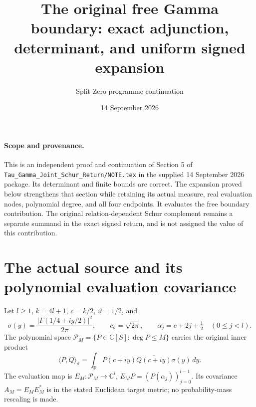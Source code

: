 \documentclass[11pt,a4paper]{article}
\title{The original free Gamma boundary: exact adjunction, determinant, and uniform signed expansion}
\author{Split-Zero programme continuation}
\date{14 September 2026}
\newcommand{\C}{\mathbb C}
\newcommand{\R}{\mathbb R}
\begin{document}
\maketitle
\paragraph{Scope and provenance.}
This is an independent proof and continuation of Section 5 of
\texttt{Tau\_Gamma\_Joint\_Schur\_Return/NOTE.tex} in the supplied
14 September 2026 package. Its determinant and finite bounds are correct.
The expansion proved below strengthens that section while retaining its
actual measure, real evaluation nodes, polynomial degree, and all four
endpoints. It evaluates the free boundary contribution. The original
relation-dependent Schur complement remains a separate summand in the
exact signed return, and is not assigned the value of this contribution.

\section{The actual source and its polynomial evaluation covariance}
Let $l\ge1$, $k=4l+1$, $c=k/2$, $\vartheta=1/2$, and
\[
 \sigma(y)=\frac{|\Gamma(1/4+iy/2)|^2}{2\pi},\qquad
 c_\sigma=\sqrt{2\pi},\qquad
 \alpha_j=c+2j+\tfrac12\quad(0\le j<l).
\]
The polynomial space $\mathcal P_M=\{P\in\C[S]:\deg P\le M\}$ carries
the original inner product
\[
 \langle P,Q\rangle_\sigma
 =\int_{\R}P(c+iy)\overline{Q(c+iy)}\sigma(y)\,dy.
\]
The evaluation map is
$E_M:\mathcal P_M\longrightarrow\C^l$, $E_MP=(P(\alpha_j))_{j=0}^{l-1}$.
Its covariance $A_M=E_ME_M^*$ is in the stated Euclidean target metric;
no probability-mass rescaling is made.
\end{document}
